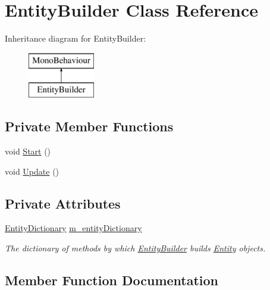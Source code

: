 \hypertarget{class_entity_builder}{}\section{Entity\+Builder Class Reference}
\label{class_entity_builder}
Inheritance diagram for Entity\+Builder\+:\begin{figure}[H]
\begin{center}
\leavevmode
\includegraphics[height=2.000000cm]{class_entity_builder}
\end{center}
\end{figure}
\subsection*{Private Member Functions}
\begin{DoxyCompactItemize}
\item 
void \hyperlink{class_entity_builder_a2a1ce76c5e5723d2b95bab7df1adb2a5}{Start} ()
\item 
void \hyperlink{class_entity_builder_adc89d08acf62e569d3845fe95fe06611}{Update} ()
\end{DoxyCompactItemize}
\subsection*{Private Attributes}
\begin{DoxyCompactItemize}
\item 
\hyperlink{class_entity_dictionary}{Entity\+Dictionary} \hyperlink{class_entity_builder_aff80495cf34b829bdb775ef12ad3bf2e}{m\+\_\+entity\+Dictionary}
\begin{DoxyCompactList}\small\item\em The dictionary of methods by which \hyperlink{class_entity_builder}{Entity\+Builder} builds \hyperlink{class_entity}{Entity} objects. \end{DoxyCompactList}\end{DoxyCompactItemize}


\subsection{Member Function Documentation}
\mbox{\label{class_entity_builder_a2a1ce76c5e5723d2b95bab7df1adb2a5}} 
